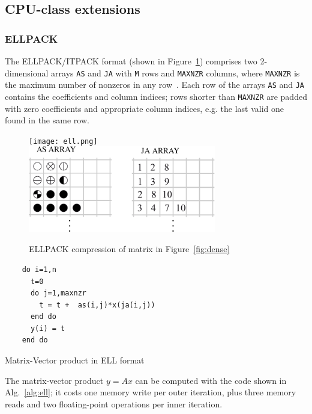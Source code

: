 \subsection{CPU-class extensions}


\subsubsection*{ELLPACK}

The ELLPACK/ITPACK format (shown in Figure~\ref{fig:ell}) 
comprises  two 2-dimensional arrays \verb|AS| and
\verb|JA|  with \verb|M| rows and \verb|MAXNZR| columns, where
\verb|MAXNZR| is the maximum
number of nonzeros in any row~\cite{ELLPACK}. 
Each row of the arrays \verb|AS| and \verb|JA| contains the
coefficients and column indices; rows shorter than
\verb|MAXNZR| are padded with zero coefficients and appropriate column
indices, e.g. the last valid one found in the same row.

\begin{figure}[ht]
	\centering
\ifcase\pdfoutput
  \texttt{[image: ell.png]}
\or
  \includegraphics[width=8.2cm]{figures/ell.pdf}
\fi
	\caption{ELLPACK compression of matrix in Figure~\ref{fig:dense}}
	\label{fig:ell}
\end{figure} 


\begin{algorithm}
\lstset{language=Fortran}
\small
  \begin{lstlisting}
    do i=1,n
      t=0
      do j=1,maxnzr
        t = t +  as(i,j)*x(ja(i,j))
      end do
      y(i) = t
    end do
  \end{lstlisting}
  \caption{\label{alg:ell} Matrix-Vector product in ELL format}
\end{algorithm}
The matrix-vector product $y=Ax$ can be computed with the code shown in
Alg.~\ref{alg:ell}; it costs  one  memory write per outer iteration, 
plus three memory reads  and two floating-point operations per inner
iteration.   


